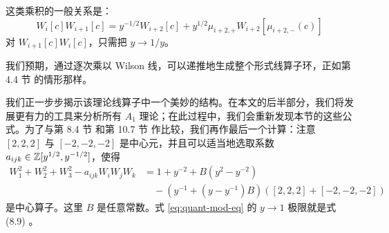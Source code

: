 这类乘积的一般关系是：
%
\begin{equation}\label{eq:quant-skein-rel}
W_{i}[c]  W_{i+1}[c] = y^{-1/2} W_{i+2}[c]   + y^{1/2} \mu_{i+2,+} W_{i+2}[\mu_{i+2,-}(c)]
\end{equation}
%
对 $W_{i+1}[c] W_{i}[c]$，只需把 $y\to 1/y$。

我们预期，通过逐次乘以 Wilson 线，可以递推地生成整个形式线算子环，正如第 4.4 节%
的情形那样。

我们正一步步揭示该理论线算子中一个美妙的结构。在本文的后半部分，我们将发展更有力的工具来分析所有 $A_1$ 理论；在此过程中，我们会重新发现本节的这些公式。为了与第 8.4 节%
和第 10.7 节%
作比较，我们再作最后一个计算：注意 $[2,2,2]$ 与 $[-2,-2,-2]$ 是中心元，并且可以适当地选取系数 $a_{ijk}\in \mathbb{Z}[y^{1/2},y^{-1/2}]$，使得
%
\begin{equation}\label{eq:quant-mod-eq}
\begin{split}
W_1^2 + W_2^2 + W_3^2 - a_{ijk} W_i W_j W_k &= 1 + y^{-2} + B(y^2-y^{-2}) \\
&\quad - \left(y^{-1} + (y-y^{-1})B\right)([2,2,2]+[-2,-2,-2])
\end{split}
\end{equation}
%
是中心算子。这里 $B$ 是任意常数。式 \eqref{eq:quant-mod-eq} 的 $y \to 1$ 极限就是式 (8.9)%
。
